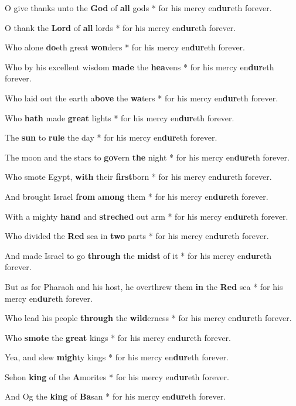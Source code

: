 \begin{multicols}{2}
	O give thanks unto the \textbf{God} of \textbf{all} gods * for his mercy en\textbf{dur}eth forever.
	
	O thank the \textbf{Lord} of \textbf{all} lords * for his mercy en\textbf{dur}eth forever.
	
	Who alone \textbf{do}eth great \textbf{won}ders * for his mercy en\textbf{dur}eth forever.
	
	Who by his excellent wisdom \textbf{made} the \textbf{hea}vens * for his mercy en\textbf{dur}eth forever.
	
	Who laid out the earth a\textbf{bove} the \textbf{wa}ters * for his mercy en\textbf{dur}eth forever.
	
	Who \textbf{hath} made \textbf{great} lights * for his mercy en\textbf{dur}eth forever.
	
	The \textbf{sun} to \textbf{rule} the day * for his mercy en\textbf{dur}eth forever.
	
	The moon and the stars to \textbf{gov}ern \textbf{the} night * for his mercy en\textbf{dur}eth forever.
	
	Who smote Egypt, \textbf{with} their \textbf{first}born * for his mercy en\textbf{dur}eth forever.
	
	And brought Israel \textbf{from} a\textbf{mong} them * for his mercy en\textbf{dur}eth forever.
	
	With a mighty \textbf{hand} and \textbf{streched} out arm * for his mercy en\textbf{dur}eth forever.
	
	Who divided the \textbf{Red} sea in \textbf{two} parts * for his mercy en\textbf{dur}eth forever.
	
	And made Israel to go \textbf{through} the \textbf{midst} of it * for his mercy en\textbf{dur}eth forever.
	
	But as for Pharaoh and his host, he overthrew them \textbf{in} the \textbf{Red} sea * for his mercy en\textbf{dur}eth forever.
	
	Who lead his people \textbf{through} the \textbf{wild}erness * for his mercy en\textbf{dur}eth forever.
	
	Who \textbf{smote} the \textbf{great} kings * for his mercy en\textbf{dur}eth forever.
	
	Yea, and slew \textbf{migh}ty kings * for his mercy en\textbf{dur}eth forever.
	
	Sehon \textbf{king} of the \textbf{A}morites * for his mercy en\textbf{dur}eth forever.
	
	And Og the \textbf{king} of \textbf{Ba}san * for his mercy en\textbf{dur}eth forever.
	

\end{multicols}
